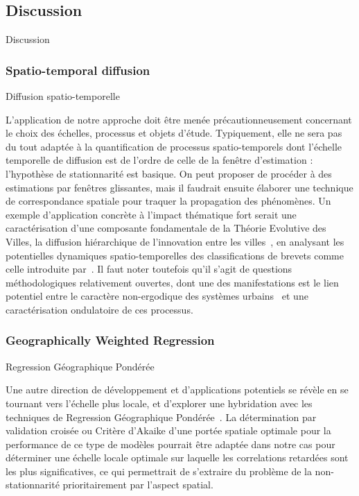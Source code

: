 \subsection{Discussion}{Discussion}


\subsubsection{Spatio-temporal diffusion}{Diffusion spatio-temporelle}


L'application de notre approche doit être menée précautionneusement concernant le choix des  échelles, processus et objets d'étude. Typiquement, elle ne sera pas du tout adaptée à la quantification de processus spatio-temporels dont l'échelle temporelle de diffusion est de l'ordre de celle de la fenêtre d'estimation : l'hypothèse de stationnarité est basique. On peut proposer de procéder à des estimations par fenêtres glissantes, mais il faudrait ensuite élaborer une technique de correspondance spatiale pour traquer la propagation des phénomènes. Un exemple d'application concrète à l'impact thématique fort serait une caractérisation d'une composante fondamentale de la Théorie Evolutive des Villes, la diffusion hiérarchique de l'innovation entre les villes~\cite{pumain2010theorie}, en analysant les potentielles dynamiques spatio-temporelles des classifications de brevets comme celle introduite par~\cite{10.1371/journal.pone.0176310}. Il faut noter toutefois qu'il s'agit de questions méthodologiques relativement ouvertes, dont une des manifestations est le lien potentiel entre le caractère non-ergodique des systèmes urbains~\cite{pumain2012urban} et une caractérisation ondulatoire de ces processus.




\subsubsection{Geographically Weighted Regression}{Regression Géographique Pondérée}


Une autre direction de développement et d'applications potentiels se révèle en se tournant vers l'échelle plus locale, et d'explorer une hybridation avec les techniques de Regression Géographique Pondérée~\cite{brunsdon1998geographically}. La détermination par validation croisée ou Critère d'Akaike d'une portée spatiale optimale pour la performance de ce type de modèles pourrait être adaptée dans notre cas pour déterminer une échelle locale optimale sur laquelle les correlations retardées sont les plus significatives, ce qui permettrait de s'extraire du problème de la non-stationnarité prioritairement par l'aspect spatial.


